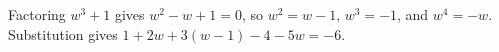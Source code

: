 Factoring $w^3+1$ gives $w^2-w+1=0$, so $w^2=w-1$, $w^3=-1$, and $w^4=-w$. Substitution gives $1+2w+3(w-1)-4-5w=\boxed{-6}$.
